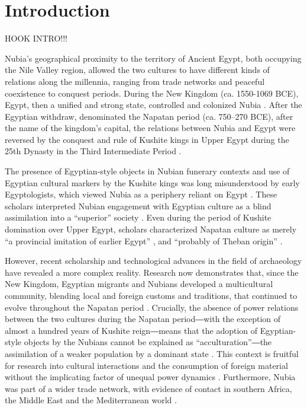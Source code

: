 \chapter{Introduction}


HOOK INTRO!!!



Nubia’s geographical proximity to the territory of Ancient Egypt, both occupying the Nile Valley region, allowed the two cultures to have different kinds of relations along the millennia, ranging from trade networks and peaceful coexistence to conquest periods. During the New Kingdom (ca. 1550-1069 BCE), Egypt, then a unified and strong state, controlled and colonized Nubia \parencites[p.~369-370]{smithNubianExperienceEgyptian2020}[p.~157]{törökTwoWorldsFrontier2009}\parencite[p.~78]{edwardsNubianArchaeologySudan2004}. After the Egyptian withdraw, denominated the Napatan period (ca. 750–270 BCE), after the name of the kingdom’s capital, the relations between Nubia and Egypt were reversed by the conquest and rule of Kushite kings in Upper Egypt during the 25th Dynasty in the Third Intermediate Period \parencites[p.~285-287]{buzonEntanglementFormationAncient2016}[p.~84]{smithRevengeKushitesAssimilation2013}.


The presence of Egyptian-style objects in Nubian funerary contexts and use of Egyptian cultural markers by the Kushite kings was long misunderstood by early Egyptologists, which viewed Nubia as a periphery reliant on Egypt \parencites[p.~191]{smithBackwaterPuritansRacism2022}. These scholars interpreted Nubian engagement with Egyptian culture as a blind assimilation into a “superior” society \parencites[p.~369]{smithNubianExperienceEgyptian2020}. Even during the period of Kushite domination over Upper Egypt, scholars characterized Napatan culture as merely “a provincial imitation of earlier Egypt” \parencites[p.~292]{wilsonBurdenEgyptInterpretation1951}, and “probably of Theban origin” \parencites[p.~22]{breastedHistoryAncientEgyptians1908}.


However, recent scholarship and technological advances in the field of archaeology have revealed a more complex reality. Research now demonstrates that, since the New Kingdom, Egyptian migrants and Nubians developed a multicultural community, blending local and foreign customs and traditions, that continued to evolve throughout the Napatan period \parencites[p.~286]{buzonStrontiumIsotope87Sr2013}. Crucially, the absence of power relations between the two cultures during the Napatan period―with the exception of almost a hundred years of Kushite reign―means that the adoption of Egyptian-style objects by the Nubians cannot be explained as “acculturation”―the assimilation of a weaker population by a dominant state \parencites[p.~528]{smithNubiaEgyptInteraction1998}. This context is fruitful for research into cultural interactions and the consumption of foreign material without the implicating factor of unequal power dynamics \parencites[~p.18-19]{howleyPowerRelationsAdoption2018}{balandaProtectingMummyReinterpretation2014}. Furthermore, Nubia was part of a wider trade network, with evidence of contact in southern Africa, the Middle East and the Mediterranean world \parencites[p.~208]{smithBackwaterPuritansRacism2022}.


